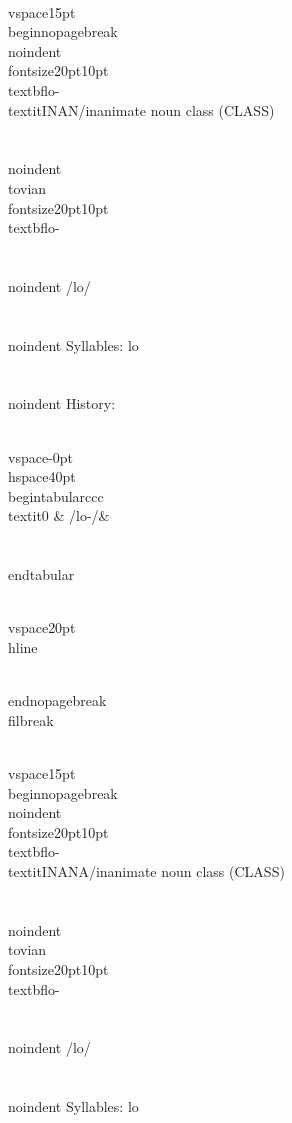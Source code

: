 \\vspace{15pt}
\\begin{nopagebreak}
\\noindent{\\fontsize{20pt}{10pt}\\textbf{lo-} } \\textit{INAN/inanimate noun class} (CLASS)\\\\
\\noindent {\\tovian \\fontsize{20pt}{10pt} \\textbf{lo-} }\\\\
\\noindent /l{\textprimstress}o/\\\\
\\noindent Syllables: lo\\\\


\\noindent History:

\\vspace{-0pt}
\\hspace{40pt}
\\begin{tabular}{ccc}
\\textit{0} & /lo-/& \\\\
\\end{tabular}

\\vspace{20pt}\\hline

\\end{nopagebreak}
\\filbreak



\\vspace{15pt}
\\begin{nopagebreak}
\\noindent{\\fontsize{20pt}{10pt}\\textbf{lo-} } \\textit{INANA/inanimate noun class} (CLASS)\\\\
\\noindent {\\tovian \\fontsize{20pt}{10pt} \\textbf{lo-} }\\\\
\\noindent /l{\textprimstress}o/\\\\
\\noindent Syllables: lo\\\\


